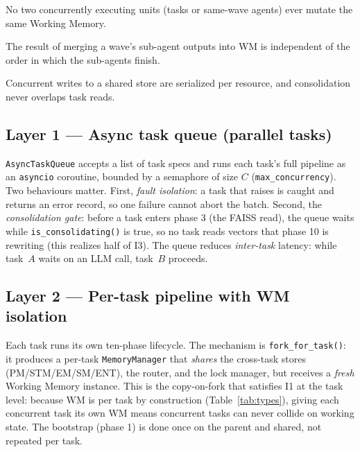 \documentclass[10pt,twocolumn]{article}
\newcommand{\code}[1]{\texttt{\small #1}}
\begin{document}
\begin{description}\itemsep1pt
\item[\textsc{I1 (WM isolation).}] No two concurrently executing units (tasks
or same-wave agents) ever mutate the same Working Memory.
\item[\textsc{I2 (deterministic merge).}] The result of merging a wave's
sub-agent outputs into WM is independent of the order in which the sub-agents
finish.
\item[\textsc{I3 (no lost writes).}] Concurrent writes to a shared store are
serialized per resource, and consolidation never overlaps task reads.
\end{description}

\subsection{Layer 1 --- Async task queue (parallel tasks)}
\code{AsyncTaskQueue} accepts a list of task specs and runs each task's full
pipeline as an \code{asyncio} coroutine, bounded by a semaphore of size $C$
(\code{max\_concurrency}). Two behaviours matter. First, \emph{fault isolation}:
a task that raises is caught and returns an error record, so one failure cannot
abort the batch. Second, the \emph{consolidation gate}: before a task enters
phase 3 (the FAISS read), the queue waits while \code{is\_consolidating()} is
true, so no task reads vectors that phase 10 is rewriting (this realizes half of
\textsc{I3}). The queue reduces \emph{inter-task} latency: while task~$A$ waits
on an LLM call, task~$B$ proceeds.

\subsection{Layer 2 --- Per-task pipeline with WM isolation}
Each task runs its own ten-phase lifecycle. The mechanism is
\code{fork\_for\_task()}: it produces a per-task \code{MemoryManager} that
\emph{shares} the cross-task stores (PM/STM/EM/SM/ENT), the router, and the lock
manager, but receives a \emph{fresh} Working Memory instance. This is the
copy-on-fork that satisfies \textsc{I1} at the task level: because WM is per task
by construction (Table~\ref{tab:types}), giving each concurrent task its own WM
means concurrent tasks can never collide on working state. The bootstrap (phase
1) is done once on the parent and shared, not repeated per task.
\end{document}
